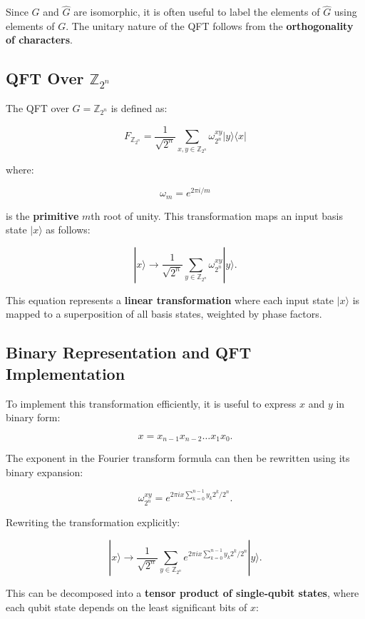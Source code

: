 \documentclass[11pt]{article}
\theoremstyle{definition}
\begin{document}
Since \( G \) and \( \hat{G} \) are isomorphic, it is often useful to label the elements of \( \hat{G} \) using elements of \( G \). The unitary nature of the QFT follows from the \textbf{orthogonality of characters}.




\subsection{QFT Over \( \mathbb{Z}_{2^n} \)}

The QFT over \( G = \mathbb{Z}_{2^n} \) is defined as:

\[
F_{\mathbb{Z}_{2^n}} = \frac{1}{\sqrt{2^n}} \sum_{x,y \in \mathbb{Z}_{2^n}} \omega_{2^n}^{xy} | y \rangle \langle x |
\]

where:

\[
\omega_m = e^{2\pi i / m}
\]

is the \textbf{primitive} \( m \)th root of unity. This transformation maps an input basis state \( |x\rangle \) as follows:

\[
| x \rangle \to \frac{1}{\sqrt{2^n}} \sum_{y \in \mathbb{Z}_{2^n}} \omega_{2^n}^{xy} | y \rangle.
\]

This equation represents a \textbf{linear transformation} where each input state \( |x\rangle \) is mapped to a superposition of all basis states, weighted by phase factors.

\subsection{Binary Representation and QFT Implementation}

To implement this transformation efficiently, it is useful to express \( x \) and \( y \) in binary form:

\[
x = x_{n-1} x_{n-2} \dots x_1 x_0.
\]

The exponent in the Fourier transform formula can then be rewritten using its binary expansion:

\[
\omega_{2^n}^{xy} = e^{2\pi i x \sum_{k=0}^{n-1} y_k 2^k / 2^n}.
\]

Rewriting the transformation explicitly:

\[
| x \rangle \to \frac{1}{\sqrt{2^n}} \sum_{y \in \mathbb{Z}_{2^n}} e^{2\pi i x \sum_{k=0}^{n-1} y_k 2^k / 2^n} | y \rangle.
\]

This can be decomposed into a \textbf{tensor product of single-qubit states}, where each qubit state depends on the least significant bits of \( x \):
\end{document}
